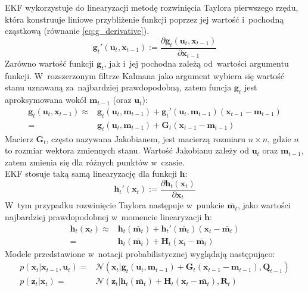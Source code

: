 \par
EKF wykorzystuje do linearyzacji metodę rozwinięcia Taylora pierwszego rzędu, która konstruuje liniowe przybliżenie funkcji poprzez jej wartość i~pochodną cząstkową (równanie \ref{eq:g_derivative}).
\begin{equation} \label{eq:g_derivative}
\boldsymbol{g}_t'(\boldsymbol{u}_t, \boldsymbol{x}_{t-1}) := \frac{\partial \boldsymbol{g}_t(\boldsymbol{u}_t, \boldsymbol{x}_{t-1})}{\partial \boldsymbol{x}_{t-1}}
\end{equation}
Zarówno wartość funkcji $\boldsymbol{g}_t$, jak i~jej pochodna zależą od~wartości argumentu funkcji. W~rozszerzonym filtrze Kalmana jako argument wybiera się wartość stanu uznawaną za~najbardziej prawdopodobną, zatem funcja $\boldsymbol{g}_t$ jest aproksymowana wokół $\boldsymbol{m}_{t-1}$ (oraz $\boldsymbol{u}_t$):
\begin{align} 
\boldsymbol{g}_t(\boldsymbol{u}_t, \boldsymbol{x}_{t-1}) \approx& \boldsymbol{g}_t(\boldsymbol{u}_t, \boldsymbol{m}_{t-1}) + \boldsymbol{g}_t'(\boldsymbol{u}_t, \boldsymbol{m}_{t-1})(\boldsymbol{x}_{t-1} - \boldsymbol{m}_{t-1}) \nonumber \\
=& \boldsymbol{g}_t(\boldsymbol{u}_t, \boldsymbol{m}_{t-1}) + \boldsymbol{G}_t(\boldsymbol{x}_{t-1} - \boldsymbol{m}_{t-1})
\end{align}
Macierz $\boldsymbol{G}_t$, często nazywana Jakobianem, jest macierzą rozmiaru $n \times n$, gdzie $n$ to rozmiar wektora zmiennych stanu. Wartość Jakobianu zależy od $\boldsymbol{u}_t$ oraz $\boldsymbol{m}_{t-1}$, zatem zmienia się dla różnych punktów w~czasie.\\
EKF stosuje taką samą linearyzację dla funkcji $\boldsymbol{h}$: $$\boldsymbol{h}_t'( \boldsymbol{x}_{t}) := \frac{\partial \boldsymbol{h}_t(\boldsymbol{x}_{t})}{\partial \boldsymbol{x}_{t}}$$ W~tym przypadku rozwinięcie Taylora następuje w~punkcie $\bar{\boldsymbol{m}_t}$, jako wartości najbardziej prawdopodobnej w~momencie linearyzacji $\boldsymbol{h}$:
\begin{align} 
\boldsymbol{h}_t(\boldsymbol{x}_{t}) \approx& \boldsymbol{h}_t(\bar{\boldsymbol{m}_{t}}) + \boldsymbol{h}_t'(\bar{\boldsymbol{m}_{t}})(\boldsymbol{x}_{t} - \bar{\boldsymbol{m}_{t}}) \nonumber \\
=& \boldsymbol{h}_t(\bar{\boldsymbol{m}_{t}}) + \boldsymbol{H}_t (\boldsymbol{x}_{t} - \bar{\boldsymbol{m}_{t}})
\end{align}
Modele przedstawione w~notacji probabilistycznej wyglądają następująco:
\begin{align}\label{eq:ExtendedKalmanProbabilisticModels}
p(\boldsymbol{x}_t|\boldsymbol{x}_{t-1},\boldsymbol{u}_t)=&\mathcal{N}(\boldsymbol{x}_t|\boldsymbol{g}_t(\boldsymbol{u}_t, \boldsymbol{m}_{t-1}) + \boldsymbol{G}_t(\boldsymbol{x}_{t-1} - \boldsymbol{m}_{t-1}),\boldsymbol{Q}_{t-1}) \nonumber \\
p(\boldsymbol{z}_t|\boldsymbol{x}_{t})=&\mathcal{N}(\boldsymbol{z}_t|\boldsymbol{h}_t(\bar{\boldsymbol{m}_{t}}) + \boldsymbol{H}_t (\boldsymbol{x}_{t} - \bar{\boldsymbol{m}_{t}}),\boldsymbol{R}_{t})
\end{align}
